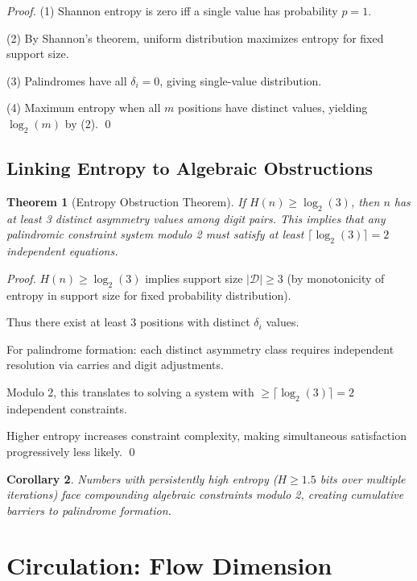 \documentclass[12pt,a4paper]{article}
\newtheorem{theorem}{Theorem}[section]
\newtheorem{corollary}[theorem]{Corollary}
\begin{document}
\begin{proof}
(1) Shannon entropy is zero iff a single value has probability $p = 1$.

(2) By Shannon's theorem, uniform distribution maximizes entropy for fixed support size.

(3) Palindromes have all $\delta_i = 0$, giving single-value distribution.

(4) Maximum entropy when all $m$ positions have distinct values, yielding $\log_2(m)$ by (2). \qed
\end{proof}

\subsection{Linking Entropy to Algebraic Obstructions}

\begin{theorem}[Entropy Obstruction Theorem]\label{thm:entropy_obst}
If $H(n) \geq \log_2(3)$, then $n$ has at least 3 distinct asymmetry values among digit pairs. This implies that any palindromic constraint system modulo 2 must satisfy at least $\lceil \log_2(3) \rceil = 2$ independent equations.
\end{theorem}

\begin{proof}
$H(n) \geq \log_2(3)$ implies support size $|\mathcal{D}| \geq 3$ (by monotonicity of entropy in support size for fixed probability distribution).

Thus there exist at least 3 positions with distinct $\delta_i$ values.

For palindrome formation: each distinct asymmetry class requires independent resolution via carries and digit adjustments.

Modulo 2, this translates to solving a system with $\geq \lceil \log_2(3) \rceil = 2$ independent constraints.

Higher entropy increases constraint complexity, making simultaneous satisfaction progressively less likely. \qed
\end{proof}

\begin{corollary}
Numbers with persistently high entropy ($H \geq 1.5$ bits over multiple iterations) face compounding algebraic constraints modulo 2, creating cumulative barriers to palindrome formation.
\end{corollary}

\section{Circulation: Flow Dimension}
\end{document}
